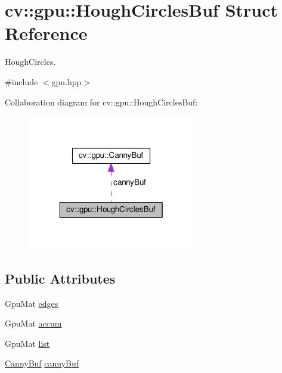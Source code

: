 \hypertarget{structcv_1_1gpu_1_1HoughCirclesBuf}{\section{cv\-:\-:gpu\-:\-:Hough\-Circles\-Buf Struct Reference}
\label{structcv_1_1gpu_1_1HoughCirclesBuf}
}


Hough\-Circles.  




{\ttfamily \#include $<$gpu.\-hpp$>$}



Collaboration diagram for cv\-:\-:gpu\-:\-:Hough\-Circles\-Buf\-:\nopagebreak
\begin{figure}[H]
\begin{center}
\leavevmode
\includegraphics[width=208pt]{structcv_1_1gpu_1_1HoughCirclesBuf__coll__graph}
\end{center}
\end{figure}
\subsection*{Public Attributes}
\begin{DoxyCompactItemize}
\item 
Gpu\-Mat \hyperlink{structcv_1_1gpu_1_1HoughCirclesBuf_ab839c1e51739fc2c5bd358828b39bcbd}{edges}
\item 
Gpu\-Mat \hyperlink{structcv_1_1gpu_1_1HoughCirclesBuf_a00fe9ce2a71b3d02060b9a97cb1cb2f3}{accum}
\item 
Gpu\-Mat \hyperlink{structcv_1_1gpu_1_1HoughCirclesBuf_ab2ea2af56aca0f063bbfe8434d462a76}{list}
\item 
\hyperlink{structcv_1_1gpu_1_1CannyBuf}{Canny\-Buf} \hyperlink{structcv_1_1gpu_1_1HoughCirclesBuf_aa90bedc09cd2eba166b1883108a86541}{canny\-Buf}
\end{DoxyCompactItemize}


